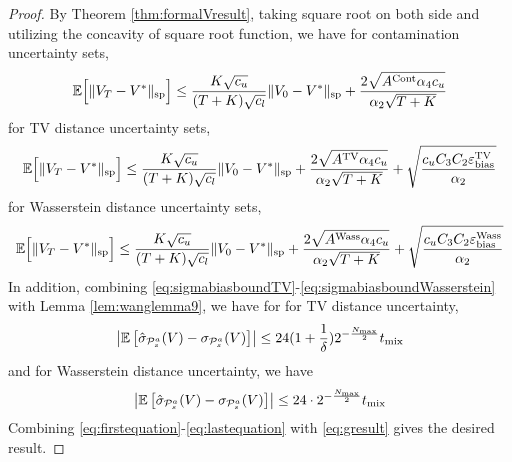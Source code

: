 \begin{proof}
    By Theorem \ref{thm:formalVresult}, taking square root on both side and utilizing the concavity of square root function, we have for contamination uncertainty sets,
    \begin{equation} \label{eq:firstequation}
        \mathbb{E}\Bigl[\|V_T - V^*\|_{\mathrm{sp}}\Bigr] \leq \frac{K \sqrt{c_u}}{(T+K)\sqrt{c_l}} \|V_0 - V^*\|_{\mathrm{sp}} + \frac{2\sqrt{ A^{\mathrm{Cont}}\alpha_4 c_u}}{\alpha_2\sqrt{T+K}}
    \end{equation}
    for TV distance uncertainty sets,
    \begin{equation} 
        \mathbb{E}\Bigl[\|V_T - V^*\|_{\mathrm{sp}}\Bigr] \leq \frac{K \sqrt{c_u}}{(T+K)\sqrt{c_l}} \|V_0 - V^*\|_{\mathrm{sp}} + \frac{2\sqrt{A^{\mathrm{TV}} \alpha_4 c_u}}{\alpha_2\sqrt{T+K}} + \sqrt{\frac{c_u C_3 C_2 \varepsilon^{\mathrm{TV}}_{\mathrm{bias}} }{\alpha_2} }
    \end{equation}
    for Wasserstein distance uncertainty sets,
    \begin{equation} 
        \mathbb{E}\Bigl[\|V_T - V^*\|_{\mathrm{sp}}\Bigr] \leq \frac{K \sqrt{c_u}}{(T+K)\sqrt{c_l}} \|V_0 - V^*\|_{\mathrm{sp}} + \frac{2 \sqrt{A^{\mathrm{Wass}} \alpha_4 c_u}}{\alpha_2\sqrt{T+K}} + \sqrt{\frac{c_u C_3 C_2 \varepsilon^{\mathrm{Wass}}_{\mathrm{bias}} }{\alpha_2}}
    \end{equation}
    In addition,  combining \eqref{eq:sigmabiasboundTV}-\eqref{eq:sigmabiasboundWasserstein} with Lemma \ref{lem:wanglemma9}, we have for  for TV distance uncertainty, 
    \begin{equation} 
         \left | \mathbb{E}\left[\hat{\sigma}_{\mathcal{P}^a_s}(V) - {\sigma}_{\mathcal{P}^a_s}(V)\right]  \right | \leq 24(1+\frac{1}{\delta}) 2^{-\frac{N_{\max}}{2}}t_{\mathrm{mix}}
    \end{equation}
    and for Wasserstein distance uncertainty, we have
    \begin{equation} \label{eq:lastequation}
         \left | \mathbb{E}\left[\hat{\sigma}_{\mathcal{P}^a_s}(V) - {\sigma}_{\mathcal{P}^a_s}(V)\right]  \right | \leq 24\cdot2^{-\frac{N_{\max}}{2}}t_{\mathrm{mix}}
    \end{equation}
Combining \eqref{eq:firstequation}-\eqref{eq:lastequation} with \eqref{eq:gresult} gives the desired result.
\end{proof}
